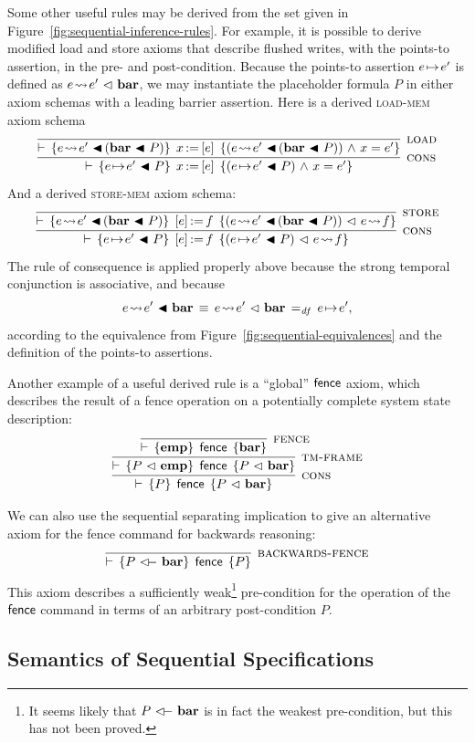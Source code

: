 \documentclass[11pt]{report}         %
\begin{document}
Some other useful rules may be derived from the set given in Figure~\ref{fig:sequential-inference-rules}. For example, it is possible to derive modified load and store axioms that describe flushed writes, with the points-to assertion, in the pre- and post-condition. Because the points-to assertion $e \!\mapsto\! e'$ is defined as $e \!\leadsto\! e' \operatorname{\,\vartriangleleft\,} \mathbf{bar}$, we may instantiate the placeholder formula $P$ in either axiom schemas with a leading barrier assertion. Here is a derived \textsc{load-mem} axiom schema \[ \infer[\textsc{cons}]{\triple{e \fpointsto e' \fsseq P}{\cload{x}{e}}{(e \fpointsto e' \fsseq P) \conj x = e'}}{\infer[\textsc{load}]{\triple{e \fwriteu e' \fsseq (\fbaru \fsseq P)}{\cload{x}{e}}{(e \fwriteu e' \fsseq (\fbaru \fsseq P)) \conj x = e'}}{}}\] And a derived \textsc{store-mem} axiom schema: \[ \infer[\textsc{cons}]{\triple{e \fpointsto e' \fsseq P}{\cstore{e}{f}}{(e \fpointsto e' \fsseq P) \fseq e \fwriteu f}}{\infer[\textsc{store}]{\triple{e \fwriteu e' \fsseq (\fbaru \fsseq P)}{\cstore{e}{f}}{(e \fwriteu e' \fsseq (\fbaru \fsseq P)) \fseq e \fwriteu f}}{}}\]The rule of consequence is applied properly above because the strong temporal conjunction is associative, and because \[e \!\leadsto\! e' \operatorname{\,\blacktriangleleft\,} \mathbf{bar} \,\equiv\, e \!\leadsto\! e' \operatorname{\,\vartriangleleft\,} \mathbf{bar} \operatorname{\;=_{\mathit{df}}\;} e \!\mapsto\! e',\] according to the equivalence from Figure~\ref{fig:sequential-equivalences} and the definition of the points-to assertions. 

Another example of a useful derived rule is a ``global'' $\operatorname{\mathsf{fence}}$ axiom, which describes the result of a fence operation on a potentially complete system state description: \[ \infer[\textsc{cons}]{ \triple{P}{\cfence}{P \fseq \fbaru} }{ \infer[\textsc{tm-frame}]{\triple{P \fseq \femp}{\cfence}{P \fseq \fbaru}}{ \infer[\textsc{fence}]{\triple{\femp}{\cfence}{\fbaru}}{} } }\] 

We can also use the sequential separating implication to give an alternative axiom for the fence command for backwards reasoning: \[ \infer[\textsc{backwards-fence}]{\triple{P \fseqri \fbaru}{\cfence}{P}}{} \] This axiom describes a sufficiently weak\footnote{It seems likely that $P \fseqri \fbaru$ is in fact the weakest pre-condition, but this has not been proved.} pre-condition for the operation of the $\operatorname{\mathsf{fence}}$ command in terms of an arbitrary post-condition $P$.

\subsection{Semantics of Sequential Specifications}
\label{sec:seq-specification-semantics}
\end{document}
